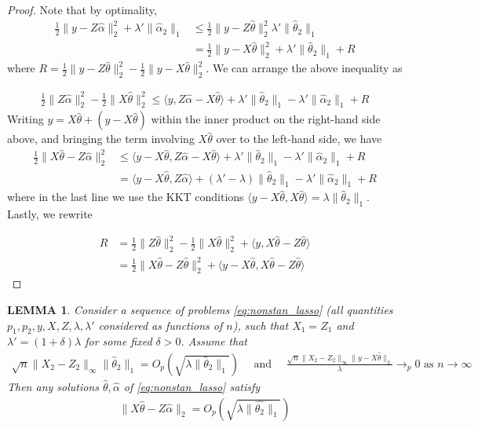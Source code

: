 \documentclass[a4paper]{article}
\newtheorem{lemma}{LEMMA}
\newcommand{\ra}{\rangle}
\newcommand{\la}{\langle}
\begin{document}
\begin{proof}
Note that by optimality,
\begin{align*}
\frac{1}{2}\|y-Z\hat{\alpha}\|^2_2 + \lambda'\|\hat{\alpha}_2\|_1 &\leq \frac{1}{2}\|y-Z\hat{\theta}\|_2^2 \lambda'\|\hat{\theta}_2\|_1\\
&= \frac{1}{2}\|y-X\hat{\theta}\|_2^2 + \lambda'\|\hat{\theta}_2\|_1 + R
\end{align*}
where $R = \frac{1}{2}\|y-Z\hat{\theta}\|_2^2 - \frac{1}{2}\|y-X\hat{\theta}\|_2^2$. We can arrange the above inequality as

\begin{align*}
\frac{1}{2}\|Z\hat{\alpha}\|_2^2 - \frac{1}{2}\|X\hat{\theta}\|_2^2 \leq \la y, Z\hat{\alpha} - X\hat{\theta}\ra + \lambda'\|\hat{\theta}_2\|_1 - \lambda'\|\hat{\alpha}_2\|_1 + R
\end{align*}
Writing $y = X\hat{\theta} + (y - X\hat{\theta})$ within the inner product on the right-hand side above, and bringing the term involving $X\hat{\theta}$ over to the left-hand side, we have
\begin{align*}
\frac{1}{2}\|X\hat{\theta} - Z\hat{\alpha}\|_2^2 &\leq \la y-X\hat{\theta}, Z\hat{\alpha} - X\hat{\theta}\ra + \lambda'\|\hat{\theta}_2\|_1 - \lambda'\|\hat{\alpha}_2\|_1 + R\\
&= \la y-X\hat{\theta}, Z\hat{\alpha} \ra + (\lambda'-\lambda)\|\hat{\theta}_2\|_1 - \lambda'\|\hat{\alpha}_2\|_1 + R
\end{align*}
where in the last line we use the KKT conditions $\la y-X\hat{\theta}, X\hat{\theta}\ra = \lambda\|\hat{\theta}_2\|_1$. Lastly, we rewrite

\begin{align*}
R &= \frac{1}{2}\|Z\hat{\theta}\|_2^2 - \frac{1}{2}\|X\hat{\theta}\|_2^2 + \la y, X\hat{\theta} - Z\hat{\theta}\ra \\
&= \frac{1}{2}\|X\hat{\theta}-Z\hat{\theta}\|_2^2 + \la y-X\hat{\theta}, X\hat{\theta}-Z\hat{\theta}\ra
\end{align*}
\end{proof}


\begin{lemma}
Consider a sequence of problems \eqref{eq:nonstan_lasso} (all quantities $p_1,p_2, y, X,Z,\lambda,\lambda'$ considered as functions of $n$), such that $X_1=Z_1$ and $\lambda' = (1+\delta)\lambda$ for some fixed $\delta>0$. Assume that 
\begin{align*}
\sqrt{n}\|X_2-Z_2\|_\infty\|\hat{\theta}_2\|_1 = O_p(\sqrt{\lambda\|\hat{\theta}_2\|_1}) \quad \text{ and } \quad \frac{\sqrt{n}\|X_2-Z_2\|_\infty\|y-X\hat{\theta}\|_2}{\lambda} \rightarrow_p 0 \text{ as } n\rightarrow\infty
\end{align*}
Then any solutions $\hat{\theta},\hat{\alpha}$ of \eqref{eq:nonstan_lasso} satisfy
\begin{align*}
\|X\hat{\theta} - Z\hat{\alpha}\|_2 = O_p(\sqrt{\lambda\|\hat{\theta_2}\|_1})
\end{align*}
\label{lemma:lemma_4}
\end{lemma}
\end{document}
